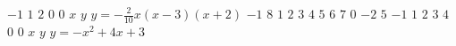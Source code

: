 \documentclass{article}
\begin{document}
\mpxshipout%
$\num{-1}$%
\stopmpxshipout
\mpxshipout%
$\num{1}$%
\stopmpxshipout
\mpxshipout%
$\num{2}$%
\stopmpxshipout
\mpxshipout%
$\num{0}$%
\stopmpxshipout
\mpxshipout%
$\num{0}$%
\stopmpxshipout
\mpxshipout%
$x$%
\stopmpxshipout
\mpxshipout%
$y$%
\stopmpxshipout
\mpxshipout%
$y=-\frac{2}{10}x(x-3)(x+2)$%
\stopmpxshipout
\mpxshipout%
$\num{-1}$%
\stopmpxshipout
\mpxshipout%
$\num{8}$%
\stopmpxshipout
\mpxshipout%
$\num{1}$%
\stopmpxshipout
\mpxshipout%
$\num{2}$%
\stopmpxshipout
\mpxshipout%
$\num{3}$%
\stopmpxshipout
\mpxshipout%
$\num{4}$%
\stopmpxshipout
\mpxshipout%
$\num{5}$%
\stopmpxshipout
\mpxshipout%
$\num{6}$%
\stopmpxshipout
\mpxshipout%
$\num{7}$%
\stopmpxshipout
\mpxshipout%
$\num{0}$%
\stopmpxshipout
\mpxshipout%
$\num{-2}$%
\stopmpxshipout
\mpxshipout%
$\num{5}$%
\stopmpxshipout
\mpxshipout%
$\num{-1}$%
\stopmpxshipout
\mpxshipout%
$\num{1}$%
\stopmpxshipout
\mpxshipout%
$\num{2}$%
\stopmpxshipout
\mpxshipout%
$\num{3}$%
\stopmpxshipout
\mpxshipout%
$\num{4}$%
\stopmpxshipout
\mpxshipout%
$\num{0}$%
\stopmpxshipout
\mpxshipout%
$\num{0}$%
\stopmpxshipout
\mpxshipout%
$x$%
\stopmpxshipout
\mpxshipout%
$y$%
\stopmpxshipout
\mpxshipout%
$y=-x^2+4x+3$%
\stopmpxshipout
\end{document}
